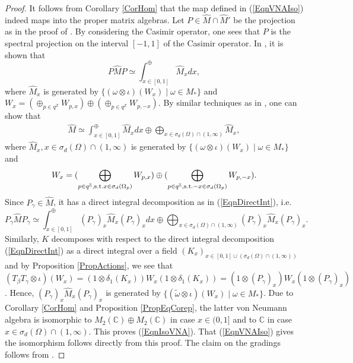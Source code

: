 \documentclass[pdftex]{sigma}
\numberwithin{equation}{section}
\theoremstyle{definition}
\begin{document}
\begin{proof}
 It follows from Corollary \ref{CorHom} that the map def\/ined in (\ref{EqnVNAIso}) indeed maps into the proper matrix algebras. Let $P \in \hat{M} \cap \hat{M}'$ be the projection as in the proof of \cite[Proposition~B.2]{CasKoe}. By considering the Casimir operator, one sees that $P$ is the spectral projection on the interval $[-1,1]$ of the Casimir operator.  In \cite[Proposition~B.2]{CasKoe}, it is shown that
\[
 P \hat{M}P \simeq \int^{\oplus}_{x \in [0,1]} \hat{M}_x dx,
\]
where $\hat{M}_x$ is generated by $\{ (\omega \otimes \iota)(W_x) \mid \omega \in M_\ast \}$ and $W_x = (\oplus_{p \in q^{\mathbb{Z}}} W_{p,x}) \oplus  (\oplus_{p \in q^{\mathbb{Z}}} W_{p,-x})$.  By similar techniques as in \cite[Proposition~B.2]{CasKoe}, one can show that
\begin{gather}\label{EqnDirectInt}
  \hat{M}  \simeq \int^{\oplus}_{x \in [0,1]} \hat{M}_x dx \oplus  \bigoplus_{x \in  \sigma_d(\Omega) \cap (1, \infty) } \hat{M}_x,
\end{gather}
where  $\hat{M}_x, x \in \sigma_d(\Omega ) \cap (1, \infty)$ is generated by $\{ (\omega \otimes \iota)(W_x) \mid \omega \in M_\ast \}$ and
\[
W_x = (\bigoplus_{p \in q^{\mathbb{Z}}, {\rm s.t. } x \in \sigma_d(\Omega_p)} W_{p,x}) \oplus  (\bigoplus_{p \in q^{\mathbb{Z}}, {\rm s.t. } -x \in \sigma_d(\Omega_p)} W_{p,-x}) .
\]
 Since $P_\gamma \in \hat{M}$, it has a direct integral decomposition as in (\ref{EqnDirectInt}), i.e.
 \[
  P_\gamma \hat{M} P_\gamma      \simeq \int^{\oplus}_{x \in [0,1]} (P_\gamma)_x \hat{M}_x (P_\gamma)_x dx  \oplus  \bigoplus_{x \in  \sigma_d(\Omega) \cap (1, \infty) }(P_\gamma)_x  \hat{M}_x (P_\gamma)_x .
\]
Similarly, $K$ decomposes with respect to the direct integral decomposition (\ref{EqnDirectInt}) as a direct integral over a f\/ield $(K_x)_{x \in [0,1] \cup (\sigma_d(\Omega) \cap (1, \infty))}$ and by Proposition \ref{PropActions}, we see that $(T_\beta T_\gamma \otimes \iota)(W_x) = (1 \otimes \delta_1(K_x)) W_{x} (1 \otimes \delta_1(K_x))  = (1 \otimes (P_\gamma)_x) W_x (1 \otimes (P_\gamma)_x)$. Hence, $(P_\gamma)_x \hat{M}_x (P_\gamma)_x$ is generated by $\{ (\tilde{\omega} \otimes \iota)(W_x) \mid \omega \in M_\ast \}$. Due to Corollary \ref{CorHom} and Proposition \ref{PropEqCorep}, the latter von Neumann algebra is isomorphic to $M_2(\mathbb{C})\oplus M_2(\mathbb{C})$ in case $x \in (0,1]$ and to $\mathbb{C}$ in case $x \in \sigma_d(\Omega) \cap (1, \infty)$. This proves (\ref{EqnIsoVNA}). That (\ref{EqnVNAIso}) gives the isomorphism follows directly from this proof. The claim on the gradings follows from \cite[Proposition 4.8]{GroKoeKus}.
\end{proof}
\end{document}
